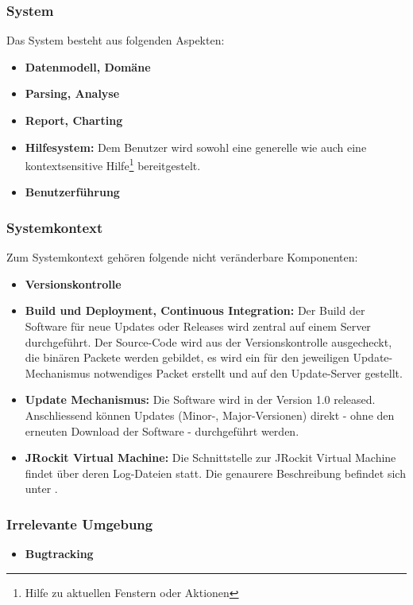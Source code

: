 \subsubsection{System}
Das System besteht aus folgenden Aspekten:
\begin{itemize}
	\item \textbf{Datenmodell, Domäne}
	\item \textbf{Parsing, Analyse}
	\item \textbf{Report, Charting}
	\item \textbf{Hilfesystem:} Dem Benutzer wird sowohl eine generelle wie auch eine kontextsensitive Hilfe\footnote{Hilfe zu aktuellen Fenstern oder Aktionen} bereitgestelt. 
	\item \textbf{Benutzerführung}
\end{itemize}

\subsubsection{Systemkontext}
Zum Systemkontext gehören folgende nicht veränderbare Komponenten:
\begin{itemize}
	\item \textbf{Versionskontrolle}
	\item \textbf{Build und Deployment, Continuous Integration:} Der Build der Software für neue Updates oder Releases wird zentral auf einem Server durchgeführt. Der Source-Code wird aus der Versionskontrolle ausgecheckt, die binären Packete werden gebildet, es wird ein für den jeweiligen Update-Mechanismus notwendiges Packet erstellt und auf den Update-Server gestellt.

	\item \textbf{Update Mechanismus:} Die Software wird in der Version 1.0 released. Anschliessend können Updates (Minor-, Major-Versionen) direkt - ohne den erneuten Download der Software - durchgeführt werden.
	\item \textbf{JRockit Virtual Machine:} Die Schnittstelle zur JRockit Virtual Machine findet über deren Log-Dateien statt. Die genaurere Beschreibung befindet sich unter .
\end{itemize}

\subsubsection{Irrelevante Umgebung}
\begin{itemize}
	\item \textbf{Bugtracking}
\end{itemize}


